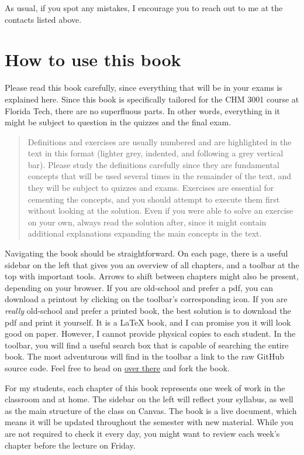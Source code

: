 \documentclass[
  9pt,
]{extbook}
\theoremstyle{definition}
\theoremstyle{definition}
\theoremstyle{definition}
\theoremstyle{definition}
\theoremstyle{remark}
\begin{document}
As usual, if you spot any mistakes, I encourage you to reach out to me at the contacts listed above.

\section*{How to use this book}\label{how-to-use-this-book}

Please read this book carefully, since everything that will be in your exams is explained here.
Since this book is specifically tailored for the CHM 3001 course at Florida Tech, there are no superfluous parts. In other words, everything in it might be subject to question in the quizzes and the final exam.

\begin{quote}
Definitions and exercises are usually numbered and are highlighted in the text in this format (lighter grey, indented, and following a grey vertical bar). Please study the definitions carefully since they are fundamental concepts that will be used several times in the remainder of the text, and they will be subject to quizzes and exams. Exercises are essential for cementing the concepts, and you should attempt to execute them first without looking at the solution. Even if you were able to solve an exercise on your own, always read the solution after, since it might contain additional explanations expanding the main concepts in the text.
\end{quote}

Navigating the book should be straightforward. On each page, there is a useful sidebar on the left that gives you an overview of all chapters, and a toolbar at the top with important tools. Arrows to shift between chapters might also be present, depending on your browser. If you are old-school and prefer a pdf, you can download a printout by clicking on the toolbar's corresponding icon. If you are \emph{really} old-school and prefer a printed book, the best solution is to download the pdf and print it yourself. It is a LaTeX book, and I can promise you it will look good on paper. However, I cannot provide physical copies to each student. In the toolbar, you will find a useful search box that is capable of searching the entire book. The most adventurous will find in the toolbar a link to the raw GitHub source code. Feel free to head on \href{https://github.com/peverati/PChem1}{over there} and fork the book.

For my students, each chapter of this book represents one week of work in the classroom and at home. The sidebar on the left will reflect your syllabus, as well as the main structure of the class on Canvas. The book is a live document, which means it will be updated throughout the semester with new material. While you are not required to check it every day, you might want to review each week's chapter before the lecture on Friday.
\end{document}
